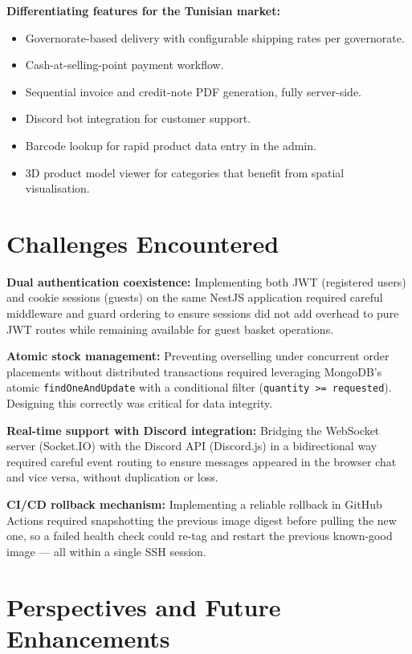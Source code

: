 \textbf{Differentiating features for the Tunisian market:}
\begin{itemize}
    \item Governorate-based delivery with configurable shipping rates per governorate.
    \item Cash-at-selling-point payment workflow.
    \item Sequential invoice and credit-note PDF generation, fully server-side.
    \item Discord bot integration for customer support.
    \item Barcode lookup for rapid product data entry in the admin.
    \item 3D product model viewer for categories that benefit from spatial visualisation.
\end{itemize}

\section*{Challenges Encountered}

\textbf{Dual authentication coexistence:} Implementing both JWT (registered users)
and cookie sessions (guests) on the same NestJS application required careful
middleware and guard ordering to ensure sessions did not add overhead to pure JWT
routes while remaining available for guest basket operations.

\textbf{Atomic stock management:} Preventing overselling under concurrent order
placements without distributed transactions required leveraging MongoDB's atomic
\texttt{findOneAndUpdate} with a conditional filter (\texttt{quantity >= requested}).
Designing this correctly was critical for data integrity.

\textbf{Real-time support with Discord integration:} Bridging the WebSocket server
(Socket.IO) with the Discord API (Discord.js) in a bidirectional way required
careful event routing to ensure messages appeared in the browser chat and vice
versa, without duplication or loss.

\textbf{CI/CD rollback mechanism:} Implementing a reliable rollback in GitHub
Actions required snapshotting the previous image digest before pulling the new one,
so a failed health check could re-tag and restart the previous known-good image ---
all within a single SSH session.

\section*{Perspectives and Future Enhancements}


